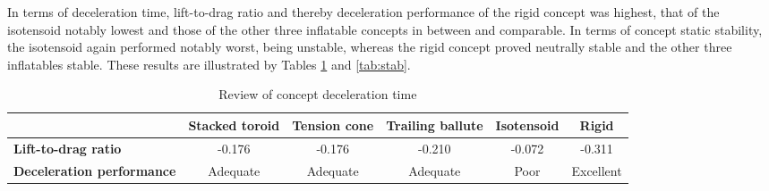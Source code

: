 In terms of deceleration time, lift-to-drag ratio and thereby deceleration performance of the rigid concept was highest, that of the isotensoid notably lowest and those of the other three inflatable concepts in between and comparable. In terms of concept static stability, the isotensoid again performed notably worst, being unstable, whereas the rigid concept proved neutrally stable and the other three inflatables stable. These results are illustrated by Tables \ref{tab:decel} and \ref{tab:stab}.
\begin{table}[ht]
\caption{Review of concept deceleration time}
\hspace{-10mm}
\begin{tabular}{|p{2.5cm}|c|c|c|c|c|}
\hline
\textbf{}                          & \textbf{Stacked toroid} & \textbf{Tension cone} & \textbf{Trailing ballute} & \textbf{Isotensoid} & \textbf{Rigid} \\ \hline
\textbf{Lift-to-drag ratio} & \cellcolor{yellow!75} -0.176  &\cellcolor{yellow!75} -0.176   &\cellcolor{yellow!75} -0.210 & \cellcolor{red!60} -0.072 &\cellcolor{green!70} -0.311              \\ \hline
\textbf{Deceleration performance} &\cellcolor{yellow!75} Adequate &\cellcolor{yellow!75}  Adequate  &\cellcolor{yellow!75} Adequate & \cellcolor{red!60}     Poor       &\cellcolor{green!70} Excellent                 \\ \hline
\end{tabular}
\label{tab:decel}
\end{table}

